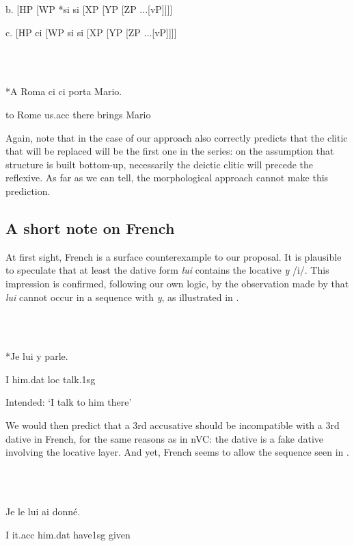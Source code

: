 \documentclass[output=paper,colorlinks,citecolor=brown]{./langscibook}
\begin{document}
  b. [HP    [WP *si si  [XP    [YP    [ZP    ...[vP]]]]

  c. [HP  ci  [WP   si si  [XP    [YP    [ZP    ...[vP]]]]

\ea%
    \label{ex:key:28}
    \gll\\
        \\
    \glt
    \z

        *A Roma  ci  ci   porta   Mario.

      to Rome  us.acc  there  brings  Mario

Again, note that in the case of  our approach also correctly predicts that the clitic that will be replaced will be the first one in the series: on the assumption that structure is built bottom-up, necessarily the deictic clitic will precede the reflexive. As far as we can tell, the morphological approach cannot make this prediction.

\subsection{A short note on French} %

At first sight, French is a surface counterexample to our proposal. It is plausible to speculate that at least the dative form \textit{lui} contains the locative \textit{y} /i/. This impression is confirmed, following our own logic, by the observation made by \citet{Rezac2010} that \textit{lui} cannot occur in a sequence with \textit{y}, as illustrated in .

\ea%
    \label{ex:key:29}
    \gll\\
        \\
    \glt
    \z

        *Je   lui     y   parle.

    I  him.dat  loc  talk.1sg

  Intended: ‘I talk to him there’

We would then predict that a 3rd accusative should be incompatible with a 3rd dative in French, for the same reasons as in nVC: the dative is a fake dative involving the locative layer. And yet, French seems to allow the sequence seen in .

\ea%
    \label{ex:key:30}
    \gll\\
        \\
    \glt
    \z

         Je le     lui    ai     donné.

  I   it.acc  him.dat  have1sg  given
\end{document}
